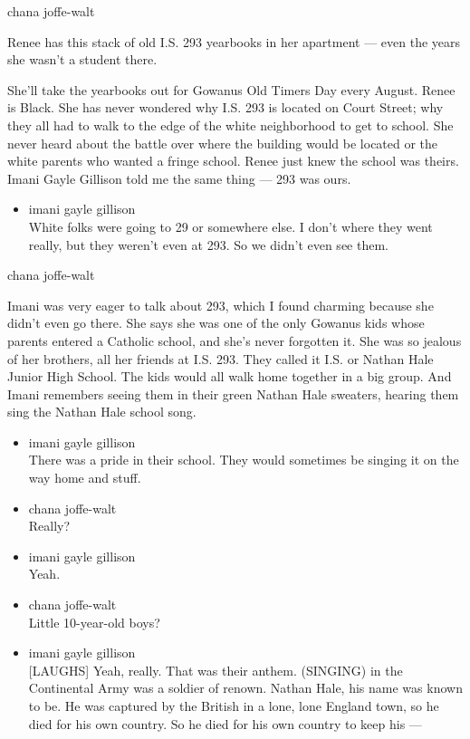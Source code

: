 chana joffe-walt

Renee has this stack of old I.S. 293 yearbooks in her apartment --- even
the years she wasn't a student there.

She'll take the yearbooks out for Gowanus Old Timers Day every August.
Renee is Black. She has never wondered why I.S. 293 is located on Court
Street; why they all had to walk to the edge of the white neighborhood
to get to school. She never heard about the battle over where the
building would be located or the white parents who wanted a fringe
school. Renee just knew the school was theirs. Imani Gayle Gillison told
me the same thing --- 293 was ours.

\begin{itemize}
\tightlist
\item
  imani gayle gillison\\
  White folks were going to 29 or somewhere else. I don't where they
  went really, but they weren't even at 293. So we didn't even see them.
\end{itemize}

chana joffe-walt

Imani was very eager to talk about 293, which I found charming because
she didn't even go there. She says she was one of the only Gowanus kids
whose parents entered a Catholic school, and she's never forgotten it.
She was so jealous of her brothers, all her friends at I.S. 293. They
called it I.S. or Nathan Hale Junior High School. The kids would all
walk home together in a big group. And Imani remembers seeing them in
their green Nathan Hale sweaters, hearing them sing the Nathan Hale
school song.

\begin{itemize}
\item
  imani gayle gillison\\
  There was a pride in their school. They would sometimes be singing it
  on the way home and stuff.
\item
  chana joffe-walt\\
  Really?
\item
  imani gayle gillison\\
  Yeah.
\item
  chana joffe-walt\\
  Little 10-year-old boys?
\item
  imani gayle gillison\\
  {[}LAUGHS{]} Yeah, really. That was their anthem. (SINGING) in the
  Continental Army was a soldier of renown. Nathan Hale, his name was
  known to be. He was captured by the British in a lone, lone England
  town, so he died for his own country. So he died for his own country
  to keep his ---
\end{itemize}

